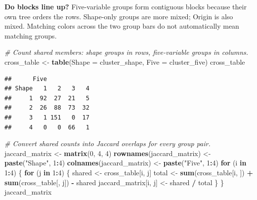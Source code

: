 \documentclass[
  10pt,
]{article}
\newenvironment{Shaded}{\begin{snugshade}}{\end{snugshade}}
\newcommand{\AttributeTok}[1]{\textcolor[rgb]{0.13,0.29,0.53}{#1}}
\newcommand{\CommentTok}[1]{\textcolor[rgb]{0.56,0.35,0.01}{\textit{#1}}}
\newcommand{\ControlFlowTok}[1]{\textcolor[rgb]{0.13,0.29,0.53}{\textbf{#1}}}
\newcommand{\DecValTok}[1]{\textcolor[rgb]{0.00,0.00,0.81}{#1}}
\newcommand{\FunctionTok}[1]{\textcolor[rgb]{0.13,0.29,0.53}{\textbf{#1}}}
\newcommand{\NormalTok}[1]{#1}
\newcommand{\OtherTok}[1]{\textcolor[rgb]{0.56,0.35,0.01}{#1}}
\newcommand{\SpecialCharTok}[1]{\textcolor[rgb]{0.81,0.36,0.00}{\textbf{#1}}}
\newcommand{\StringTok}[1]{\textcolor[rgb]{0.31,0.60,0.02}{#1}}
\begin{document}
\textbf{Do blocks line up?} Five-variable groups form contiguous blocks
because their own tree orders the rows. Shape-only groups are more
mixed; Origin is also mixed. Matching colors across the two group bars
do not automatically mean matching groups.

\begin{Shaded}
\begin{Highlighting}[]
\CommentTok{\# Count shared members: shape groups in rows, five{-}variable groups in columns.}
\NormalTok{cross\_table }\OtherTok{\textless{}{-}} \FunctionTok{table}\NormalTok{(}\AttributeTok{Shape =}\NormalTok{ cluster\_shape, }\AttributeTok{Five =}\NormalTok{ cluster\_five)}
\NormalTok{cross\_table}
\end{Highlighting}
\end{Shaded}

\begin{verbatim}
##      Five
## Shape   1   2   3   4
##     1  92  27  21   5
##     2  26  88  73  32
##     3   1 151   0  17
##     4   0   0  66   1
\end{verbatim}

\begin{Shaded}
\begin{Highlighting}[]
\CommentTok{\# Convert shared counts into Jaccard overlaps for every group pair.}
\NormalTok{jaccard\_matrix }\OtherTok{\textless{}{-}} \FunctionTok{matrix}\NormalTok{(}\DecValTok{0}\NormalTok{, }\DecValTok{4}\NormalTok{, }\DecValTok{4}\NormalTok{)}
\FunctionTok{rownames}\NormalTok{(jaccard\_matrix) }\OtherTok{\textless{}{-}} \FunctionTok{paste}\NormalTok{(}\StringTok{"Shape"}\NormalTok{, }\DecValTok{1}\SpecialCharTok{:}\DecValTok{4}\NormalTok{)}
\FunctionTok{colnames}\NormalTok{(jaccard\_matrix) }\OtherTok{\textless{}{-}} \FunctionTok{paste}\NormalTok{(}\StringTok{"Five"}\NormalTok{, }\DecValTok{1}\SpecialCharTok{:}\DecValTok{4}\NormalTok{)}
\ControlFlowTok{for}\NormalTok{ (i }\ControlFlowTok{in} \DecValTok{1}\SpecialCharTok{:}\DecValTok{4}\NormalTok{) \{}
  \ControlFlowTok{for}\NormalTok{ (j }\ControlFlowTok{in} \DecValTok{1}\SpecialCharTok{:}\DecValTok{4}\NormalTok{) \{}
\NormalTok{    shared }\OtherTok{\textless{}{-}}\NormalTok{ cross\_table[i, j]}
\NormalTok{    total }\OtherTok{\textless{}{-}} \FunctionTok{sum}\NormalTok{(cross\_table[i, ]) }\SpecialCharTok{+} \FunctionTok{sum}\NormalTok{(cross\_table[, j]) }\SpecialCharTok{{-}}\NormalTok{ shared}
\NormalTok{    jaccard\_matrix[i, j] }\OtherTok{\textless{}{-}}\NormalTok{ shared }\SpecialCharTok{/}\NormalTok{ total}
\NormalTok{  \}}
\NormalTok{\}}
\NormalTok{jaccard\_matrix}
\end{Highlighting}
\end{Shaded}
\end{document}
